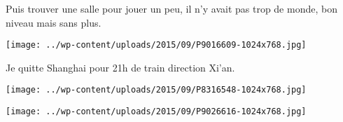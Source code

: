  Puis trouver une salle pour jouer un peu, il n'y avait pas trop de monde, bon niveau mais sans plus.
\begin{center} \texttt{[image: ../wp-content/uploads/2015/09/P9016609-1024x768.jpg]} \end{center}

\pagebreak
 Je quitte Shanghai pour 21h de train direction Xi'an.
\begin{center} \texttt{[image: ../wp-content/uploads/2015/09/P8316548-1024x768.jpg]} \end{center}
\begin{center} \texttt{[image: ../wp-content/uploads/2015/09/P9026616-1024x768.jpg]} \end{center}
